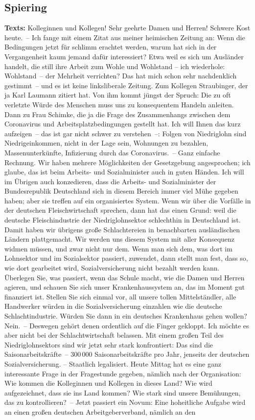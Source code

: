 \documentclass{article}
\begin{document}
\subsection{Spiering}
\noindent\textbf{Texts:} Kolleginnen und Kollegen! Sehr geehrte Damen und Herren! Schwere Kost heute. – Ich fange mit einem Zitat aus meiner heimischen Zeitung an: Wenn die Bedingungen jetzt für schlimm erachtet werden, warum hat sich in der Vergangenheit kaum jemand dafür interessiert? Etwa weil es sich um Ausländer handelt, die still ihre Arbeit zum Wohle und Wohlstand – ich wiederhole: Wohlstand – der Mehrheit verrichten? Das hat mich schon sehr nachdenklich gestimmt – und es ist keine linksliberale Zeitung. Zum Kollegen Straubinger, der ja Karl Laumann zitiert hat. Von ihm kommt jüngst der Spruch: Die zu oft verletzte Würde des Menschen muss uns zu konsequentem Handeln anleiten.  Dann zu Frau Schimke, die ja die Frage des Zusammenhangs zwischen dem Coronavirus und Arbeitsplatzbedingungen gestellt hat. Ich will Ihnen das kurz aufzeigen – das ist gar nicht schwer zu verstehen –: Folgen von Niedriglohn sind Niedrigeinkommen, nicht in der Lage sein, Wohnungen zu bezahlen, Massenunterkünfte, Infizierung durch das Coronavirus. – Ganz einfache Rechnung.  Wir haben mehrere Möglichkeiten der Gesetzgebung angesprochen; ich glaube, das ist beim Arbeits- und Sozialminister auch in guten Händen. Ich will im Übrigen auch konzedieren, dass die Arbeits- und Sozialminister der Bundesrepublik Deutschland sich in diesem Bereich immer viel Mühe gegeben haben; aber sie treffen auf ein organisiertes System. Wenn wir über die Vorfälle in der deutschen Fleischwirtschaft sprechen, dann hat das einen Grund: weil die deutsche Fleischindustrie der Niedriglohnsektor schlechthin in Deutschland ist. Damit haben wir übrigens große Schlachtereien in benachbarten ausländischen Ländern plattgemacht. Wir werden uns diesem System mit aller Konsequenz widmen müssen, und zwar nicht nur dem. Wenn man sich dem, was dort im Lohnsektor und im Sozialsektor passiert, zuwendet, dann stellt man fest, dass so, wie dort gearbeitet wird, Sozialversicherung nicht bezahlt werden kann. Überlegen Sie, was passiert, wenn das Schule macht, wie die Damen und Herren agieren, und schauen Sie sich unser Krankenhaussystem an, das im Moment gut finanziert ist. Stellen Sie sich einmal vor, all unsere tollen Mittelständler, alle Handwerker würden in die Sozialversicherung einzahlen wie die deutsche Schlachtindustrie. Würden Sie dann in ein deutsches Krankenhaus gehen wollen? Nein. – Deswegen gehört denen ordentlich auf die Finger gekloppt.  Ich möchte es aber nicht bei der Schlachtwirtschaft belassen. Mit einem großen Teil des Niedriglohnsektors sind wir jetzt sehr stark konfrontiert: Das sind die Saisonarbeitskräfte – 300 000 Saisonarbeitskräfte pro Jahr, jenseits der deutschen Sozialversicherung.  – Staatlich legalisiert. Heute Mittag hat es eine ganz interessante Frage in der Fragestunde gegeben, nämlich nach der Organisation: Wie kommen die Kolleginnen und Kollegen in dieses Land? Wie wird aufgezeichnet, dass sie ins Land kommen? Wie stark sind unsere Bemühungen, das zu kontrollieren? – Jetzt passiert ein Novum: Eine hoheitliche Aufgabe wird an einen großen deutschen Arbeitgeberverband, nämlich an den 
\end{document}
